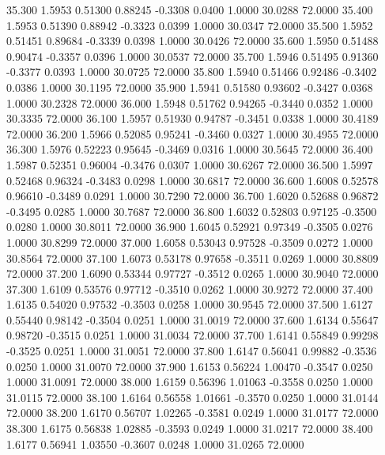   35.300   1.5953   0.51300   0.88245  -0.3308   0.0400   1.0000  30.0288  72.0000
  35.400   1.5953   0.51390   0.88942  -0.3323   0.0399   1.0000  30.0347  72.0000
  35.500   1.5952   0.51451   0.89684  -0.3339   0.0398   1.0000  30.0426  72.0000
  35.600   1.5950   0.51488   0.90474  -0.3357   0.0396   1.0000  30.0537  72.0000
  35.700   1.5946   0.51495   0.91360  -0.3377   0.0393   1.0000  30.0725  72.0000
  35.800   1.5940   0.51466   0.92486  -0.3402   0.0386   1.0000  30.1195  72.0000
  35.900   1.5941   0.51580   0.93602  -0.3427   0.0368   1.0000  30.2328  72.0000
  36.000   1.5948   0.51762   0.94265  -0.3440   0.0352   1.0000  30.3335  72.0000
  36.100   1.5957   0.51930   0.94787  -0.3451   0.0338   1.0000  30.4189  72.0000
  36.200   1.5966   0.52085   0.95241  -0.3460   0.0327   1.0000  30.4955  72.0000
  36.300   1.5976   0.52223   0.95645  -0.3469   0.0316   1.0000  30.5645  72.0000
  36.400   1.5987   0.52351   0.96004  -0.3476   0.0307   1.0000  30.6267  72.0000
  36.500   1.5997   0.52468   0.96324  -0.3483   0.0298   1.0000  30.6817  72.0000
  36.600   1.6008   0.52578   0.96610  -0.3489   0.0291   1.0000  30.7290  72.0000
  36.700   1.6020   0.52688   0.96872  -0.3495   0.0285   1.0000  30.7687  72.0000
  36.800   1.6032   0.52803   0.97125  -0.3500   0.0280   1.0000  30.8011  72.0000
  36.900   1.6045   0.52921   0.97349  -0.3505   0.0276   1.0000  30.8299  72.0000
  37.000   1.6058   0.53043   0.97528  -0.3509   0.0272   1.0000  30.8564  72.0000
  37.100   1.6073   0.53178   0.97658  -0.3511   0.0269   1.0000  30.8809  72.0000
  37.200   1.6090   0.53344   0.97727  -0.3512   0.0265   1.0000  30.9040  72.0000
  37.300   1.6109   0.53576   0.97712  -0.3510   0.0262   1.0000  30.9272  72.0000
  37.400   1.6135   0.54020   0.97532  -0.3503   0.0258   1.0000  30.9545  72.0000
  37.500   1.6127   0.55440   0.98142  -0.3504   0.0251   1.0000  31.0019  72.0000
  37.600   1.6134   0.55647   0.98720  -0.3515   0.0251   1.0000  31.0034  72.0000
  37.700   1.6141   0.55849   0.99298  -0.3525   0.0251   1.0000  31.0051  72.0000
  37.800   1.6147   0.56041   0.99882  -0.3536   0.0250   1.0000  31.0070  72.0000
  37.900   1.6153   0.56224   1.00470  -0.3547   0.0250   1.0000  31.0091  72.0000
  38.000   1.6159   0.56396   1.01063  -0.3558   0.0250   1.0000  31.0115  72.0000
  38.100   1.6164   0.56558   1.01661  -0.3570   0.0250   1.0000  31.0144  72.0000
  38.200   1.6170   0.56707   1.02265  -0.3581   0.0249   1.0000  31.0177  72.0000
  38.300   1.6175   0.56838   1.02885  -0.3593   0.0249   1.0000  31.0217  72.0000
  38.400   1.6177   0.56941   1.03550  -0.3607   0.0248   1.0000  31.0265  72.0000
